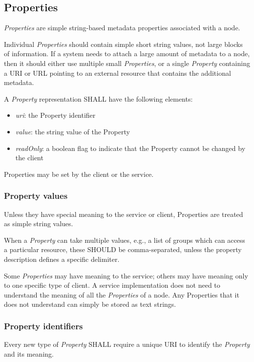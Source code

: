 \documentclass[11pt,a4paper]{ivoa}
\begin{document}
\subsection{Properties}
\label{subsec:properties}
\emph{Properties} are simple string-based metadata properties associated with a node.

Individual \emph{Properties} should contain simple short string values, not large blocks of information. If a system needs to attach a large amount of metadata to a node, then it should either use multiple small \emph{Properties}, or a single \emph{Property} containing a URI or URL pointing to an external resource that contains the additional metadata.

A \emph{Property} representation SHALL have the following elements:

\begin{itemize}
    \item \emph{uri}: the Property identifier
    \item \emph{value}: the string value of the Property
    \item \emph{readOnly}: a boolean flag to indicate that the Property cannot be changed by the client
\end{itemize}

Properties may be set by the client or the service.

\subsubsection{Property values}
\label{subsubsec:property values}
Unless they have special meaning to the service or client, Properties are treated as simple string values.

When a \emph{Property} can take multiple values, e.g., a list of groups which can access a particular resource, these SHOULD be comma-separated, unless the property description defines a specific delimiter.

Some \emph{Properties} may have meaning to the service; others may have meaning only to one specific type of client. A service implementation does not need to understand the meaning of all the \emph{Properties} of a node. Any Properties that it does not understand can simply be stored as text strings.

\subsubsection{Property identifiers}
\label{subsubsec:property identifiers}
Every new type of \emph{Property} SHALL require a unique URI to identify the \emph{Property} and its meaning.
\end{document}
